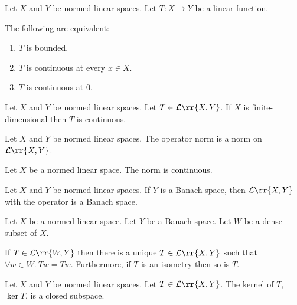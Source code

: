 \documentclass{article}
\begin{document}
\begin{theorem}
  Let $X$ and $Y$ be normed linear spaces. Let $T:X\to Y$ be a linear function.

  The following are equivalent:
  \begin{enumerate}
    \item $T$ is bounded.
    \item $T$ is continuous at every $x\in X$.
    \item $T$ is continuous at $0$.
  \end{enumerate}
\end{theorem}

\begin{theorem}
  Let $X$ and $Y$ be normed linear spaces. Let $T\in\mathcal L\rr{X,Y}$.
  If $X$ is finite-dimensional then $T$ is continuous.
\end{theorem}

\begin{theorem}
  Let $X$ and $Y$ be normed linear spaces. The operator norm is a norm on
  $\mathcal L\rr{X,Y}$.
\end{theorem}

\begin{lemma}
  Let $X$ be a normed linear space. The norm is continuous.
\end{lemma}

\begin{theorem}
  Let $X$ and $Y$ be normed linear spaces. If $Y$ is a Banach space, then
  $\mathcal L\rr{X,Y}$ with the operator is a Banach space.
\end{theorem}

\begin{theorem}
  Let $X$ be a normed linear space. Let $Y$ be a Banach space. Let $W$ be a dense
  subset of $X$.

  If $T\in\mathcal L\rr{W,Y}$ then there is a unique $\bar T\in\mathcal L\rr{X,Y}$
  such that $\forall w\in W.\: \bar T w = T w$. Furthermore, if $T$ is an isometry then so
  is $\bar T$.
\end{theorem}

\begin{theorem}
  Let $X$ and $Y$ be normed linear spaces. Let $T\in\mathcal L\rr{X,Y}$. The kernel of
  $T$, $\ker T$, is a closed subspace.
\end{theorem}
\end{document}
